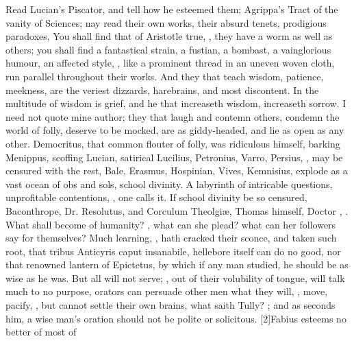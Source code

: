 Read Lucian's Piscator, and tell how he esteemed them; Agrippa's Tract
of the vanity of Sciences; nay read their own works, their absurd
tenets, prodigious paradoxes,  You shall find
that of Aristotle true, ,
they have a worm as well as others; you shall find a fantastical
strain, a fustian, a bombast, a vainglorious humour, an affected style,
\etc{}, like a prominent thread in an uneven woven cloth, run parallel
throughout their works. And they that teach wisdom, patience, meekness,
are the veriest dizzards, harebrains, and most discontent. In the
multitude of wisdom is grief, and he that increaseth wisdom, increaseth
sorrow. I need not quote mine author; they that laugh and contemn
others, condemn the world of folly, deserve to be mocked, are as
giddy-headed, and lie as open as any other. Democritus, that
common flouter of folly, was ridiculous himself, barking Menippus,
scoffing Lucian, satirical Lucilius, Petronius, Varro, Persius, \etc{},
may be censured with the rest,  Bale, Erasmus, Hospinian, Vives, Kemnisius, explode as a vast
ocean of obs and sols, school divinity. A labyrinth of intricable
questions, unprofitable contentions, , one
calls it. If school divinity be so censured,  Baconthrope, Dr. Resolutus, and Corculum Theolgi\ae{},
Thomas himself, Doctor , \etc{}. What
shall become of humanity? , what can she plead? what can her
followers say for themselves? Much learning,  ,
hath cracked their sconce, and taken such root, that tribus Anticyris
caput insanabile, hellebore itself can do no good, nor that renowned
lantern of Epictetus, by which if any man studied, he should be as
wise as he was. But all will not serve; , out of their volubility of tongue, will
talk much to no purpose, orators can persuade other men what they will,
, move, pacify, \etc{}, but cannot settle their own
brains, what saith Tully? ; and as \Seneca seconds him, a wise man's oration should
not be polite or solicitous. [2\baselineskip]Fabius esteems no better of most of
